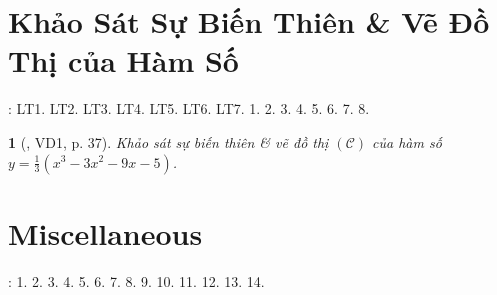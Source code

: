 \documentclass{article}
\newtheorem{baitoan}{}
\begin{document}
\section{Khảo Sát Sự Biến Thiên \& Vẽ Đồ Thị của Hàm Số}
\cite[Chap. I, \S4, pp. 28--44]{SGK_Toan_12_Canh_Dieu_tap_1}: LT1. LT2. LT3. LT4. LT5. LT6. LT7. 1. 2. 3. 4. 5. 6. 7. 8.

\begin{baitoan}[\cite{SGK_Toan_12_giai_tich_nang_cao}, VD1, p. 37]
	Khảo sát sự biến thiên \& vẽ đồ thị $(\mathcal{C})$ của hàm số $y = \frac{1}{3}(x^3 - 3x^2 - 9x - 5)$.
\end{baitoan}


\section{Miscellaneous}
\cite[BTCCI, pp. 45--48]{SGK_Toan_12_Canh_Dieu_tap_1}: 1. 2. 3. 4. 5. 6. 7. 8. 9. 10. 11. 12. 13. 14.


\printbibliography[heading=bibintoc]
	
\end{document}
